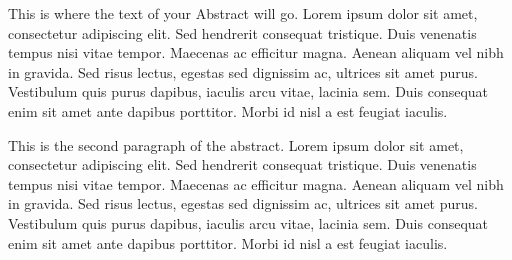This is where the text of your Abstract will go. Lorem ipsum dolor sit
amet, consectetur adipiscing elit. Sed hendrerit consequat tristique.
Duis venenatis tempus nisi vitae tempor. Maecenas ac efficitur magna.
Aenean aliquam vel nibh in gravida. Sed risus lectus, egestas sed
dignissim ac, ultrices sit amet purus. Vestibulum quis purus dapibus,
iaculis arcu vitae, lacinia sem. Duis consequat enim sit amet ante
dapibus porttitor. Morbi id nisl a est feugiat iaculis.

This is the second paragraph of the abstract. Lorem ipsum dolor sit
amet, consectetur adipiscing elit. Sed hendrerit consequat tristique.
Duis venenatis tempus nisi vitae tempor. Maecenas ac efficitur magna.
Aenean aliquam vel nibh in gravida. Sed risus lectus, egestas sed
dignissim ac, ultrices sit amet purus. Vestibulum quis purus dapibus,
iaculis arcu vitae, lacinia sem. Duis consequat enim sit amet ante
dapibus porttitor. Morbi id nisl a est feugiat iaculis.
